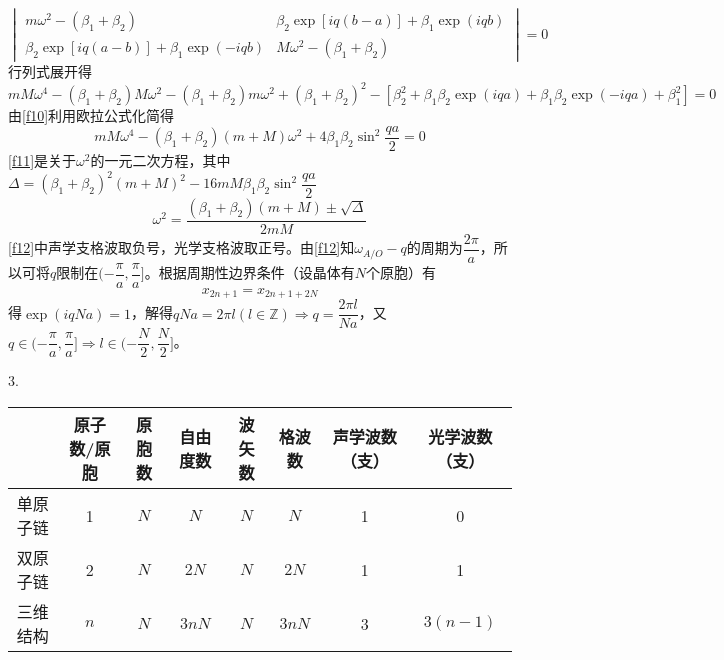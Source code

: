 \documentclass[titlepage]{article}
\begin{document}
\begin{equation}\label{f8}
\begin{vmatrix}
m\omega^2-(\beta_1+\beta_2)& \beta_2\exp[iq(b-a)]+\beta_1\exp(iqb) \\
\beta_2\exp[iq(a-b)]+\beta_1\exp(-iqb)& M\omega^2-(\beta_1+\beta_2)
\end{vmatrix}=0
\end{equation}
行列式展开得\begin{equation}\label{f10}
mM\omega^4-(\beta_1+\beta_2)M\omega^2-(\beta_1+\beta_2)m\omega^2+(\beta_1+\beta_2)^2-[\beta_2^2+\beta_1\beta_2\exp(iqa)+\beta_1\beta_2\exp(-iqa)+\beta_1^2]=0
\end{equation}
由\eqref{f10}利用欧拉公式化简得
\begin{equation}\label{f11}
mM\omega^4-(\beta_1+\beta_2)(m+M)\omega^2+4\beta_1\beta_2\sin^2\frac{qa}{2}=0
\end{equation}
\eqref{f11}是关于$ \omega^2 $的一元二次方程，其中$ \Delta=(\beta_1+\beta_2)^2(m+M)^2-16mM\beta_1\beta_2\sin^2\dfrac{qa}{2}$
\begin{equation}\label{f12}
\omega^2=\dfrac{(\beta_1+\beta_2)(m+M)\pm\sqrt{\Delta}}{2mM}
\end{equation}
\eqref{f12}中声学支格波取负号，光学支格波取正号。由\eqref{f12}知$ \omega_{A/O}-q $的周期为$ \dfrac{2\pi}{a} $，所以可将$ q $限制在$(-\dfrac{\pi}{a},\dfrac{\pi}{a}]$。根据周期性边界条件（设晶体有$ N $个原胞）有\begin{equation}\label{key}
x_{2n+1}=x_{2n+1+2N}
\end{equation}
得$ \exp(iqNa)=1 $，解得$ qNa=2\pi l(l\in\mathbb{Z})\Rightarrow q=\dfrac{2\pi l}{Na}$，又$ q\in(-\dfrac{\pi}{a},\dfrac{\pi}{a}]\Rightarrow l\in(-\dfrac{N}{2},\dfrac{N}{2}] $。

3.
\begin{table}[ht]
	\centering
	\begin{tabular}{@{}cccccccc@{}}
		\toprule
		& 原子数/原胞 & 原胞数 & 自由度数 & 波矢数 & 格波数\footnotemark & 声学波数（支） & 光学波数（支） \\ \midrule
		单原子链 & 1      & $N$ &    $ N $  &   $ N $  & $ N $    &     1    &     0    \\
		双原子链 & 2      & $N$ &      $ 2N $&   $ N $  &  $ 2N $   &    1     &    1     \\
		三维结构 & $n$    & $N$ &      $ 3nN $&   $ N $  &   $ 3nN $  &   3      &   $ 3(n-1) $      \\ \bottomrule
	\end{tabular}

\end{table}
\end{document}
